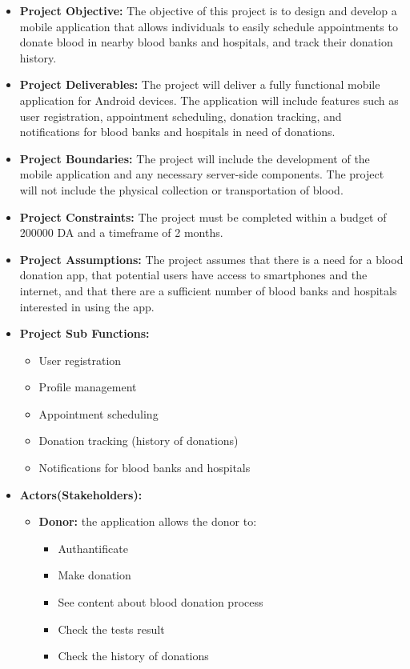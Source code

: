 \begin{itemize}
\item \textbf{Project Objective:} The objective of this project is to design and develop a mobile application that allows individuals to easily schedule appointments to donate blood in nearby blood banks and hospitals, and track their donation history.
\item \textbf{Project Deliverables: }The project will deliver a fully functional mobile application for Android devices. The application will include features such as user registration, appointment scheduling, donation tracking, and notifications for blood banks and hospitals in need of donations.
\item \textbf{Project Boundaries:} The project will include the development of the mobile application and any necessary server-side components. The project will not include the physical collection or transportation of blood.
\item \textbf{Project Constraints:} The project must be completed within a budget of 200000 DA and a timeframe of 2 months.
\item \textbf{Project Assumptions: } The project assumes that there is a need for a blood donation app, that potential users have access to smartphones and the internet, and that there are a sufficient number of blood banks and hospitals interested in using the app.
\item \textbf{Project Sub Functions:} 
\begin{itemize}
\item  User registration
\item  Profile management
\item Appointment scheduling
\item  Donation tracking (history of donations)
\item  Notifications for blood banks and hospitals
\end{itemize}
\item \textbf{Actors(Stakeholders):} 
\begin{itemize}
\item \textbf{Donor:}  the application allows the donor to:
\begin{itemize}
\item  Authantificate 
\item  Make donation
\item See content about blood donation process
\item  Check the tests result
\item  Check the history of donations

\end{itemize}
\end{itemize}
\end{itemize}
